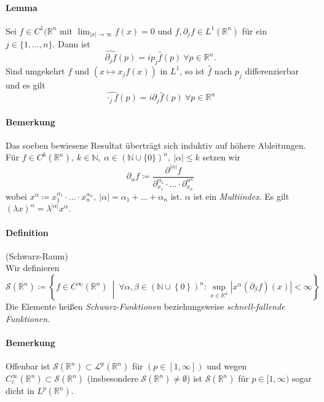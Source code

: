 \documentclass[12pt,a4paper,fleqn]{article}
\def\abs#1{{\left\vert #1 \right\vert}}
\def\set#1{{\left\{ #1 \right\}}}
\def\Mid{\ \middle|\ }
\def\R{{\mathbb{R}}}
\begin{document}
\paragraph{Lemma} Sei $f \in C^1(\mathbb{R}^n$ mit $\lim_{\vert x \vert \rightarrow \infty} f(x) = 0$ und $f, \partial_j f \in L^1(\mathbb{R}^n)$ für ein \mbox{$j \in \{1, \dots, n\}$}. Dann ist
\begin{displaymath}
\widehat{\partial_j f}(p) = ip_j \widehat{f}(p)\ \forall p \in \mathbb{R}^n.
\end{displaymath}
Sind umgekehrt $f$ und $(x \mapsto x_j f(x))$ in $L^1$, so ist $\widehat{f}$ nach $p_j$ differenzierbar und es gilt
\begin{displaymath}
\widehat{\cdot_j f}(p) = i\partial_j\widehat{f}(p)\ \forall p \in \mathbb{R}^n
\end{displaymath}

\paragraph{Bemerkung} Das soeben bewiesene Resultat überträgt sich induktiv auf höhere Ableitungen. Für $f \in C^k(\mathbb{R}^n),\ k \in \mathbb{N},\ \alpha \in (\mathbb{N} \cup \{ 0 \})^n,\ \vert \alpha \vert \leq k$ setzen wir
\begin{displaymath}
\partial_\alpha f \coloneqq \frac{\partial^{\abs{\alpha}}f}{\partial_{x_1}^{\alpha_1}\cdot \dots \cdot \partial_{x_n}^{\alpha^n}}
\end{displaymath}
wobei $x^\alpha \coloneqq x_1^{\alpha_1}\cdot\dots\cdot x_n^{\alpha_n},\ \abs{\alpha} = \alpha_1 + \dots + \alpha_n$ ist. $\alpha$ ist ein \textit{Multiindex}. Es gilt $(\lambda x)^\alpha = \lambda^{\abs{\alpha}}x^\alpha$.

\paragraph{Definition} (Schwarz-Raum)\\
Wir definieren
\begin{displaymath}
\mathscr{S}(\mathbb{R}^n) \coloneqq \set{f \in C^\infty(\mathbb{R}^n) \Mid \forall\alpha, \beta \in (\mathbb{N} \cup \set{0})^n : \sup_{x \in \mathbb{R}^n} \abs{x^\alpha(\partial_\beta f)(x)} < \infty}
\end{displaymath}
Die Elemente heißen \textit{Schwarz-Funktionen} beziehungsweise \textit{schnell-fallende Funktionen}.

\paragraph{Bemerkung} Offenbar ist $\mathscr{S}(\mathbb{R}^n) \subset \mathscr{L}^p(\mathbb{R}^n)$ für $(p \in [1, \infty])$ und wegen\linebreak \mbox{$C^\infty_c(\mathbb{R}^n) \subset \mathscr{S}(\R^n)$} (insbesondere $\mathscr{S}(\R^n) \not = \emptyset$) ist $\mathscr{S}(\R^n)$ für $p \in [1, \infty)$ sogar dicht in $L^p(\R^n)$.
\end{document}
